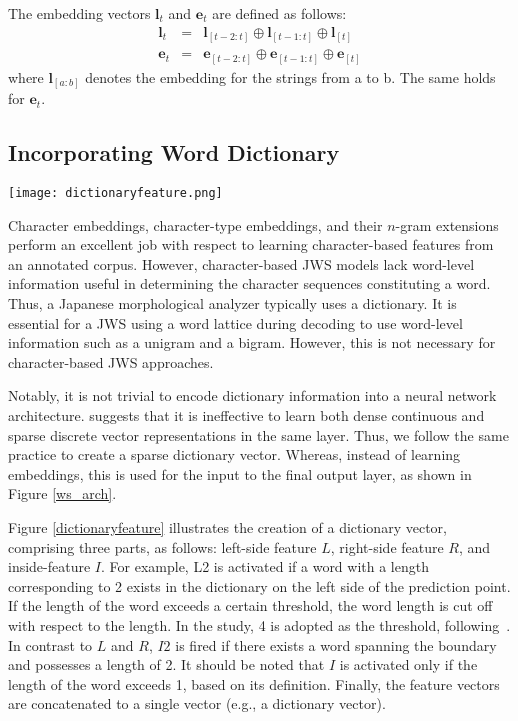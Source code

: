 \documentclass[11pt]{article}
\begin{document}
The embedding vectors $\bm{l}_t$ and $\bm{e}_t$ are defined as follows:
\begin{eqnarray}
\bm{l}_t &=& \bm{l}_{[t-2:t]} \oplus \bm{l}_{[t-1:t]} \oplus \bm{l}_{[t]} \\
\bm{e}_t &=& \bm{e}_{[t-2:t]} \oplus \bm{e}_{[t-1:t]} \oplus \bm{e}_{[t]} 
\end{eqnarray}
where $\bm{l}_{[a:b]}$ denotes the embedding for the strings from a to b. The
same holds for $\bm{e}_t$.

\subsection{Incorporating Word Dictionary}

\begin{figure*}[t]    
 \centering
 \texttt{[image: dictionaryfeature.png]}              
 \caption{Example of a dictionary vector.}    
 \label{dictionaryfeature}    
\end{figure*}

Character embeddings, character-type embeddings, and their $n$-gram extensions
perform an excellent job with respect to learning character-based features
from an annotated corpus. However, character-based JWS models lack word-level
information useful in determining the character sequences constituting a
word.
Thus, a Japanese morphological analyzer typically uses a dictionary.
It is essential for a JWS using a word lattice during decoding to use
word-level information such as a unigram and a bigram. However, this is not
necessary for character-based JWS approaches.

Notably, it is not trivial to encode dictionary information into a neural
network architecture.
 suggests that it is ineffective to learn both
dense continuous and sparse discrete vector representations in the same layer.
Thus, we follow the same practice to create a sparse dictionary vector.
Whereas, instead of learning embeddings, this is used for the input to the
final output layer, as shown in Figure \ref{ws_arch}.

Figure \ref{dictionaryfeature} illustrates the creation of a dictionary
vector, comprising three parts, as follows: left-side feature $L$, right-side
feature $R$, and inside-feature $I$. For example, L2 is activated if a word
with a length corresponding to 2 exists in the dictionary on the left side of
the prediction point. If the length of the word exceeds a certain threshold,
the word length is cut off with respect to the length. In the study, 4 is
adopted as the threshold,
following~.
In contrast to $L$ and $R$, 
$I2$ is fired if there exists a word spanning the boundary and possesses a
length of 2. It should be noted that $I$ is activated only if the length of
the word exceeds 1, based on its definition.
Finally, the feature vectors are concatenated to a single vector (e.g., a
dictionary vector).
\end{document}
